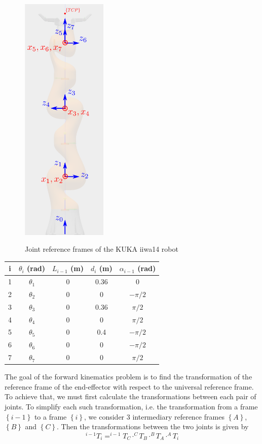 \begin{center}
\begin{figure}[H]
\centering
\includegraphics[height=12cm]{images/iiwa-frames.png}\\
\caption{Joint reference frames of the KUKA iiwa14 robot}
\end{figure}
\end{center}

\begin{center}
\begin{tabular}{ |c|c|c|c|c| } 
\hline
i & $θ_i$ (rad) & $L_{i-1}$ (m) & $d_i$ (m) & $α_{i-1}$ (rad) \\
\hline
1 & $θ_1$ & 0 & 0.36 & 0 \\
2 & $θ_2$ & 0 & 0 & $-π/2$ \\
3 & $θ_3$ & 0 & 0.36 & $π/2$ \\
4 & $θ_4$ & 0 & 0 & $π/2$\\
5 & $θ_5$ & 0 & 0.4 & $-π/2$ \\
6 & $θ_6$ & 0 & 0 & $-π/2$ \\
7 & $θ_7$ & 0 & 0 & $π/2$ \\
\hline
\end{tabular}
\end{center}

The goal of the forward kinematics problem is to find the transformation of the reference frame of the end-effector with respect to the universal reference frame. To achieve that, we must first calculate the 
transformations between each pair of joints. To simplify each such transformation, i.e. the transformation from a frame $\left\lbrace i-1 \right\rbrace$ to a frame $\left\lbrace i \right\rbrace$, we 
consider 3 intermediary reference frames $\left\lbrace A \right\rbrace$, $\left\lbrace B \right\rbrace$ and $\left\lbrace C \right\rbrace$. Then the transformations between the two joints is given by
\begin{equation}
^{i-1}T_i = ^{i-1}T_C \cdot ^{C}T_B \cdot ^{B}T_A \cdot ^{A}T_i
\end{equation}

